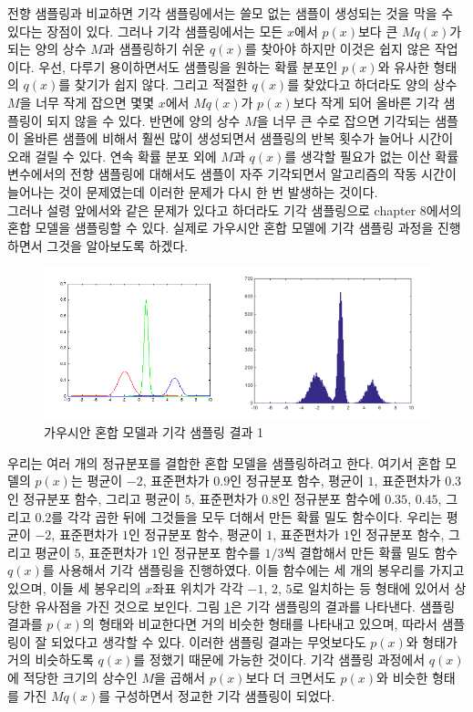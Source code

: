 \documentclass[a4paper]{oblivoir}
\begin{document}
전향 샘플링과 비교하면 기각 샘플링에서는 쓸모 없는 샘플이 생성되는 것을 막을 수 있다는 장점이 있다. 그러나 기각 샘플링에서는 모든 $x$에서 $p(x)$보다 큰 $Mq(x)$가 되는 양의 상수 $M$과 샘플링하기 쉬운 $q(x)$를 찾아야 하지만 이것은 쉽지 않은 작업이다. 우선, 다루기 용이하면서도 샘플링을 원하는 확률 분포인 $p(x)$와 유사한 형태의 $q(x)$를 찾기가 쉽지 않다. 그리고 적절한 $q(x)$를 찾았다고 하더라도 양의 상수 $M$을 너무 작게 잡으면 몇몇 $x$에서 $Mq(x)$가 $p(x)$보다 작게 되어 올바른 기각 샘플링이 되지 않을 수 있다. 반면에 양의 상수 $M$을 너무 큰 수로 잡으면 기각되는 샘플이 올바른 샘플에 비해서 훨씬 많이 생성되면서 샘플링의 반복 횟수가 늘어나 시간이 오래 걸릴 수 있다. 연속 확률 분포 외에 $M$과 $q(x)$를 생각할 필요가 없는 이산 확률 변수에서의 전향 샘플링에 대해서도 샘플이 자주 기각되면서 알고리즘의 작동 시간이 늘어나는 것이 문제였는데 이러한 문제가 다시 한 번 발생하는 것이다.  \\

그러나 설령 앞에서와 같은 문제가 있다고 하더라도 기각 샘플링으로 chapter 8에서의 혼합 모델을 샘플링할 수 있다. 실제로 가우시안 혼합 모델에 기각 샘플링 과정을 진행하면서 그것을 알아보도록 하겠다.  

\begin{figure}[ht] \centering 
\includegraphics[scale=0.8]{fig10_5.png} 
\caption{가우시안 혼합 모델과 기각 샘플링 결과 1}
\label{fig:10-5}
\end{figure}  

우리는 여러 개의 정규분포를 결합한 혼합 모델을 샘플링하려고 한다. 여기서 혼합 모델의 $p(x)$는 평균이 $-2$, 표준편차가 $0.9$인 정규분포 함수, 평균이 $1$, 표준편차가 $0.3$인 정규분포 함수, 그리고 평균이 $5$, 표준편차가 $0.8$인 정규분포 함수에 $0.35$, $0.45$, 그리고 $0.2$를 각각 곱한 뒤에 그것들을 모두 더해서 만든 확률 밀도 함수이다. 우리는 평균이 $-2$, 표준편차가 $1$인 정규분포 함수, 평균이 $1$, 표준편차가 $1$인 정규분포 함수, 그리고 평균이 $5$, 표준편차가 $1$인 정규분포 함수를 $1/3$씩 결합해서 만든 확률 밀도 함수 $q(x)$를 사용해서 기각 샘플링을 진행하였다. 이들 함수에는 세 개의 봉우리를 가지고 있으며, 이들 세 봉우리의 $x$좌표 위치가 각각 $-1$, $2$, $5$로 일치하는 등 형태에 있어서 상당한 유사점을 가진 것으로 보인다. 그림 \ref{fig:10-5}은 기각 샘플링의 결과를 나타낸다. 샘플링 결과를 $p(x)$의 형태와 비교한다면 거의 비슷한 형태를 나타내고 있으며, 따라서 샘플링이 잘 되었다고 생각할 수 있다. 이러한 샘플링 결과는 무엇보다도 $p(x)$와 형태가 거의 비슷하도록 $q(x)$를 정했기 때문에 가능한 것이다. 기각 샘플링 과정에서 $q(x)$에 적당한 크기의 상수인 $M$을 곱해서 $p(x)$보다 더 크면서도 $p(x)$와 비슷한 형태를 가진 $Mq(x)$를 구성하면서 정교한 기각 샘플링이 되었다. \\
\end{document}
